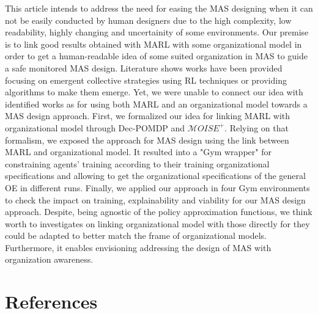 \documentclass[runningheads]{llncs}
\newcounter{proof}
\begin{document}
This article intends to address the need for easing the MAS designing when it can not be easily conducted by human designers due to the high complexity, low readability, highly changing and uncertainity of some environments. Our premise is to link good results obtained with MARL with some organizational model in order to get a human-readable idea of some suited organization in MAS to guide a safe monitored MAS design. Literature shows works have been provided focusing on emergent collective strategies using RL techniques or providing algorithms to make them emerge. Yet, we were unable to connect our idea with identified works as for using both MARL and an organizational model towards a MAS design approach. First, we formalized our idea for linking MARL with organizational model through Dec-POMDP and $\mathcal{M}OISE^+$. Relying on that formalism, we exposed the approach for MAS design using the link between MARL and organizational model. It resulted into a "Gym wrapper" for constraining agents' training according to their training organizational specifications and allowing to get the organizational specifications of the general OE in different runs. Finally, we applied our approach in four Gym environments to check the impact on training, explainability and viability for our MAS design approach. Despite, being agnostic of the policy approximation functions, we think worth to investigates on linking organizational model with those directly for they could be adapted to better match the frame of organizational models. Furthermore, it enables envisioning addressing the design of MAS with organization awareness.


%
%
%
% 
% 
%
\section*{References}

% 






% 
\end{document}
